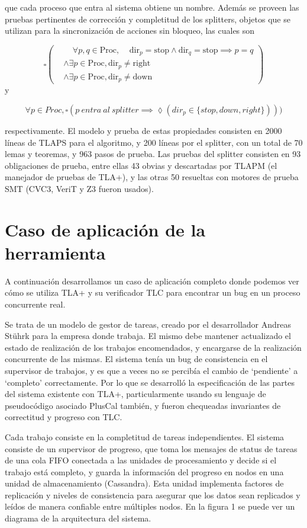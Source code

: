 \documentclass[runningheads]{llncs}
\begin{document}
que cada proceso que entra al sistema obtiene un nombre.
Además se proveen las pruebas pertinentes de corrección y completitud de los splitters, objetos que se utilizan para la sincronización de acciones sin bloqueo,  las cuales son

\[
\square \left( \begin{aligned}
    &\phantom{\land} \forall p,q \in \text{Proc}, \phantom{\land} \text{dir}_p = \text{stop} \land \text{dir}_q = \text{stop} \implies p = q \\
    &\land \exists p \in \text{Proc}, \text{dir}_p \neq \text{right} \\
    &\land \exists p \in \text{Proc}, \text{dir}_p \neq \text{down}
\end{aligned} \right)
\]
y

\[
    \forall p \in Proc, \square(p\ entra\ al\ splitter \implies \lozenge(dir_p \in \{stop, down, right\})))    
\]

respectivamente.
El modelo y prueba de estas propiedades consisten en 2000 líneas de TLAPS para el algoritmo, y 200 líneas por el splitter, con un total de 70 lemas y teoremas, y 963 pasos de prueba. Las pruebas del splitter consisten en 93 obligaciones de prueba, entre ellas 43 obvias y descartadas por TLAPM (el manejador de pruebas de TLA+), y las otras 50 resueltas con motores de prueba SMT (CVC3, VeriT y Z3 fueron usados).

\section{Caso de aplicación de la herramienta}
A continuación desarrollamos un caso de aplicación completo donde podemos ver cómo se utiliza TLA+ y su verificador TLC para encontrar un bug en un proceso concurrente real.

Se trata de un modelo de gestor de tareas, creado por el desarrollador Andreas Stührk para la empresa donde trabaja. El mismo debe mantener actualizado el estado de realización de los trabajos encomendados, y encargarse de la realización concurrente de las mismas. El sistema tenía un bug de consistencia en el supervisor de trabajos, y es que a veces no se percibía el cambio de ‘pendiente’ a ‘completo’ correctamente. Por lo que se desarrolló la especificación de las partes del sistema existente con TLA+, particularmente usando su lenguaje de pseudocódigo asociado PlusCal también, y fueron chequeadas invariantes de correctitud y progreso con TLC.

Cada trabajo consiste en la completitud de tareas independientes. El sistema consiste de un supervisor de progreso, que toma los mensajes de status de tareas de una cola FIFO conectada a las unidades de procesamiento y decide si el trabajo está completo, y guarda la información del progreso en nodos en una unidad de almacenamiento (Cassandra). Esta unidad implementa factores de replicación y niveles de consistencia para asegurar que los datos sean replicados y leídos de manera confiable entre múltiples nodos. En la figura 1 se puede ver un diagrama de la arquitectura del sistema. 
\end{document}

